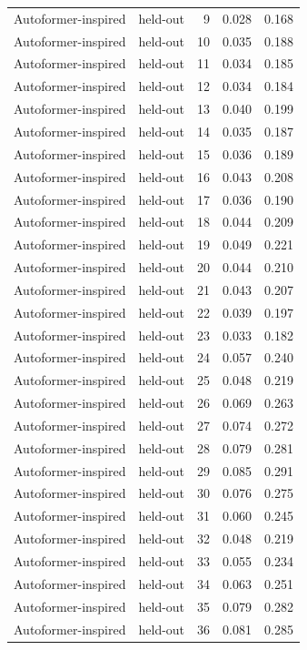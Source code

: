 \begin{tabular}{llrrr}
Autoformer-inspired & held-out & 9 & 0.028 & 0.168 \\
Autoformer-inspired & held-out & 10 & 0.035 & 0.188 \\
Autoformer-inspired & held-out & 11 & 0.034 & 0.185 \\
Autoformer-inspired & held-out & 12 & 0.034 & 0.184 \\
Autoformer-inspired & held-out & 13 & 0.040 & 0.199 \\
Autoformer-inspired & held-out & 14 & 0.035 & 0.187 \\
Autoformer-inspired & held-out & 15 & 0.036 & 0.189 \\
Autoformer-inspired & held-out & 16 & 0.043 & 0.208 \\
Autoformer-inspired & held-out & 17 & 0.036 & 0.190 \\
Autoformer-inspired & held-out & 18 & 0.044 & 0.209 \\
Autoformer-inspired & held-out & 19 & 0.049 & 0.221 \\
Autoformer-inspired & held-out & 20 & 0.044 & 0.210 \\
Autoformer-inspired & held-out & 21 & 0.043 & 0.207 \\
Autoformer-inspired & held-out & 22 & 0.039 & 0.197 \\
Autoformer-inspired & held-out & 23 & 0.033 & 0.182 \\
Autoformer-inspired & held-out & 24 & 0.057 & 0.240 \\
Autoformer-inspired & held-out & 25 & 0.048 & 0.219 \\
Autoformer-inspired & held-out & 26 & 0.069 & 0.263 \\
Autoformer-inspired & held-out & 27 & 0.074 & 0.272 \\
Autoformer-inspired & held-out & 28 & 0.079 & 0.281 \\
Autoformer-inspired & held-out & 29 & 0.085 & 0.291 \\
Autoformer-inspired & held-out & 30 & 0.076 & 0.275 \\
Autoformer-inspired & held-out & 31 & 0.060 & 0.245 \\
Autoformer-inspired & held-out & 32 & 0.048 & 0.219 \\
Autoformer-inspired & held-out & 33 & 0.055 & 0.234 \\
Autoformer-inspired & held-out & 34 & 0.063 & 0.251 \\
Autoformer-inspired & held-out & 35 & 0.079 & 0.282 \\
Autoformer-inspired & held-out & 36 & 0.081 & 0.285 \\

\end{tabular}

